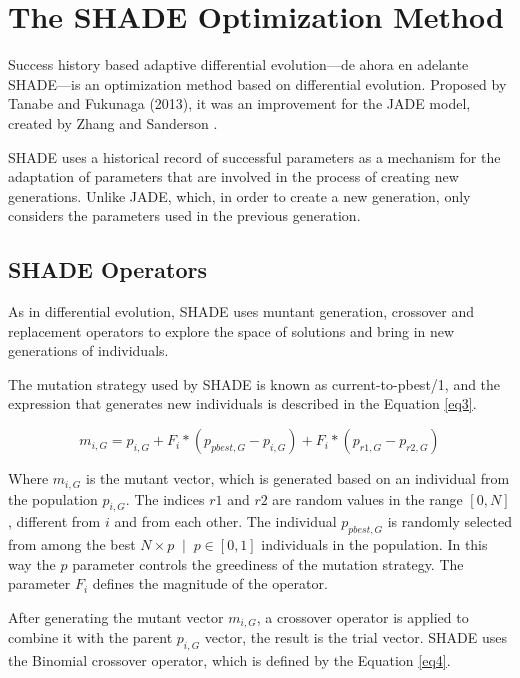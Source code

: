 \documentclass[review]{elsarticle}
\begin{document}
\section{The SHADE Optimization Method}

Success history based adaptive differential evolution---de ahora en adelante SHADE---is an optimization method based on differential evolution. Proposed by Tanabe and Fukunaga (2013), it was an improvement for the JADE model, created by Zhang and Sanderson \cite{tanabe2013success}\cite{zhang2009jade}.

SHADE uses a historical record of successful parameters as a mechanism for the adaptation of parameters that are involved in the process of creating new generations. Unlike JADE, which, in order to create a new generation, only considers the parameters used in the previous generation. 

\subsection{SHADE Operators}

As in differential evolution, SHADE uses muntant generation, crossover and replacement operators to explore the space of solutions and bring in new generations of individuals.

The mutation strategy used by SHADE is known as current-to-pbest/1, and the expression that generates new individuals is described in the Equation \eqref{eq3}.

\begin{equation}
m_{i,G} = p_{i,G} + F_i * (p_{pbest, G} - p_{i,G}) + F_i * (p_{r1, G} - p_{r2,G})
\label{eq3}
\end{equation}

Where $m_{i,G}$ is the mutant vector, which is generated based on an individual from the population $p_{i,G}$. The indices $r1$ and $r2$ are random values in the range $[0,N]$, different from $i$ and from each other. The individual $p_{pbest, G}$ is randomly selected from among the best $N \times p\;\;|\;\;p\in [0,1]$ individuals in the population. In this way the $p$ parameter controls the greediness of the mutation strategy. The parameter $F_i$ defines the magnitude of the operator.

After generating the mutant vector $m_{i,G}$, a crossover operator is applied to combine it with the parent $p_{i,G}$ vector, the result is the trial vector. SHADE uses the Binomial crossover operator, which is defined by the Equation \eqref{eq4}.
\end{document}
